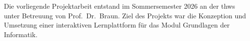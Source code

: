 Die vorliegende Projektarbeit entstand im Sommersemester 2026 an der \gls{thws} unter Betreuung von Prof.~Dr.~Braun. Ziel des Projekts war die Konzeption und Umsetzung einer interaktiven Lernplattform f{\"u}r das Modul \glqq Grundlagen der Informatik\grqq{}.






